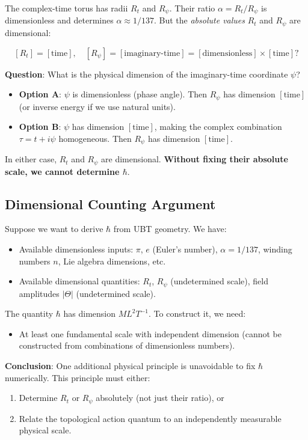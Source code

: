 \documentclass[12pt]{article}
\begin{document}
The complex-time torus has radii $R_t$ and $R_\psi$. Their ratio $\alpha = R_t/R_\psi$ is dimensionless and determines $\alpha \approx 1/137$. But the \emph{absolute values} $R_t$ and $R_\psi$ are dimensional:

\[
[R_t] = [\text{time}], \quad [R_\psi] = [\text{imaginary-time}] = [\text{dimensionless}] \times [\text{time}]?
\]

\textbf{Question}: What is the physical dimension of the imaginary-time coordinate $\psi$?

\begin{itemize}
\item \textbf{Option A}: $\psi$ is dimensionless (phase angle). Then $R_\psi$ has dimension $[\text{time}]$ (or inverse energy if we use natural units).

\item \textbf{Option B}: $\psi$ has dimension $[\text{time}]$, making the complex combination $\tau = t + i\psi$ homogeneous. Then $R_\psi$ has dimension $[\text{time}]$.
\end{itemize}

In either case, $R_t$ and $R_\psi$ are dimensional. \textbf{Without fixing their absolute scale, we cannot determine $\hbar$}.

\subsection{Dimensional Counting Argument}

Suppose we want to derive $\hbar$ from UBT geometry. We have:

\begin{itemize}
\item Available dimensionless inputs: $\pi$, $e$ (Euler's number), $\alpha = 1/137$, winding numbers $n$, Lie algebra dimensions, etc.
\item Available dimensional quantities: $R_t$, $R_\psi$ (undetermined scale), field amplitudes $|\Theta|$ (undetermined scale).
\end{itemize}

The quantity $\hbar$ has dimension $ML^2T^{-1}$. To construct it, we need:
\begin{itemize}
\item At least one fundamental scale with independent dimension (cannot be constructed from combinations of dimensionless numbers).
\end{itemize}

\textbf{Conclusion}: One additional physical principle is unavoidable to fix $\hbar$ numerically. This principle must either:
\begin{enumerate}
\item Determine $R_t$ or $R_\psi$ absolutely (not just their ratio), or
\item Relate the topological action quantum to an independently measurable physical scale.
\end{enumerate}
\end{document}
